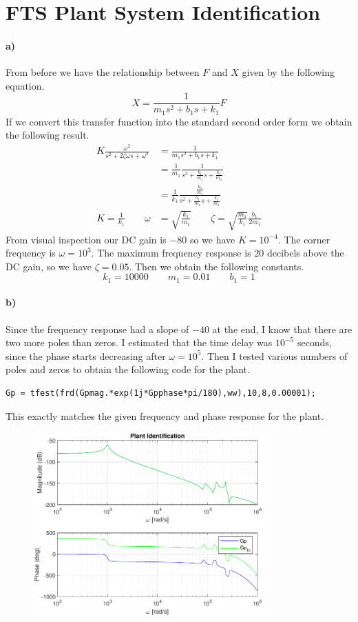 \documentclass[12pt]{article}
\begin{document}
\section{FTS Plant System Identification}

\paragraph{a)}

From before we have the relationship between \(F\) and \(X\) given by the following equation.
\[X=\frac{1}{m_1s^2 + b_1s + k_1}F\]
If we convert this transfer function into the standard second order form we obtain the following result.
\begin{align*}
    K\frac{\omega^2}{s^2+2\zeta\omega s + \omega^2}&=\frac{1}{m_1s^2 + b_1s + k_1}\\
    &=\frac{1}{m_1}\frac{1}{s^2 + \frac{b_1}{m_1}s + \frac{k_1}{m_1}}\\
    &=\frac{1}{k_1}\frac{\frac{k_1}{m_1}}{s^2 + \frac{b_1}{m_1}s + \frac{k_1}{m_1}}\\
    K=\frac{1}{k_1}\qquad \omega&=\sqrt{\frac{k_1}{m_1}}\qquad\zeta=\sqrt{\frac{m_1}{k_1}}\frac{b_1}{2m_1}
\end{align*}
From visual inspection our DC gain is \(-80\) so we have \(K=10^{-4}\). The corner frequency is \(\omega=10^3\).
The maximum frequency response is \(20\) decibels above the DC gain, so we have \(\zeta=0.05\). Then we obtain
the following constants.
\[k_1=10000 \qquad m_1=0.01 \qquad b_1=1\]

\paragraph{b)}

Since the frequency response had a slope of \(-40\) at the end, I know that there are two more poles than zeros.
I estimated that the time delay was \(10^{-5}\) seconds, since the phase starts decreasing after \(\omega=10^5\).
Then I tested various numbers of poles and zeros to obtain the following code for the plant.
\begin{verbatim}
Gp = tfest(frd(Gpmag.*exp(1j*Gpphase*pi/180),ww),10,8,0.00001);
\end{verbatim}
This exactly matches the given frequency and phase response for the plant.
\begin{figure}[H]
    \begin{center}
        \includegraphics[width=3.5in]{Plant-b.pdf}
    \end{center}
\end{figure}
\end{document}

